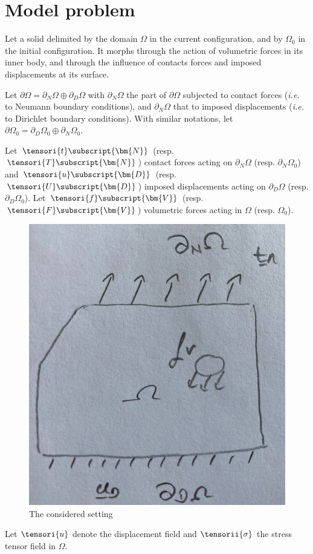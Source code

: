 \section{Model problem}
    \label{model_problem}

    Let a solid delimited by the domain $\Omega$ in the current configuration, and by $\Omega_{0}$ in the initial configuration. It morphs through the action of volumetric forces in its inner body, and through the influence of contacts forces and imposed displacements at its surface.

    Let $\partial \Omega = \partial_N \Omega \oplus \partial_D \Omega$ with $\partial_N \Omega$ the part of $\partial \Omega$ subjected to contact forces (\textit{i.e.} to Neumann boundary conditions),
    and $\partial_N \Omega$ that to imposed displacements (\textit{i.e.} to Dirichlet boundary conditions).
    With similar notations, let $\partial \Omega_0 = \partial_D \Omega_0 \oplus \partial_N \Omega_0$.

    Let $\tensori{t}\subscript{\bm{N}}$ (resp. $\tensori{T}\subscript{\bm{N}}$) contact forces acting on $\partial_N \Omega$ (resp. $\partial_N \Omega_{0}$) and $\tensori{u}\subscript{\bm{D}}$ (resp. $\tensori{U}\subscript{\bm{D}}$) imposed displacements acting on $\partial_D \Omega$ (resp. $\partial_D \Omega_{0}$). Let $\tensori{f}\subscript{\bm{V}}$ (resp. $\tensori{F}\subscript{\bm{V}}$) volumetric forces acting in $\Omega$ (resp. $\Omega_{0}$).

    \begin{figure}[h!]
        \centering
        \includegraphics[width=7.cm]{img/fig_intro_0.png}
        \caption{The considered setting}
        \label{fig_intro_0}
    \end{figure}
    
    Let $\tensori{u}$ denote the displacement field and $\tensorii{\sigma}$ the stress tensor field in $\Omega$.


